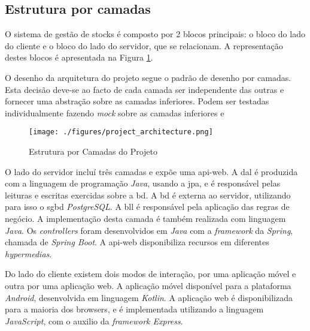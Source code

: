 %
%
\subsection{Estrutura por camadas}\label{subsec222}

O sistema de gestão de stocks é composto por 2 blocos principais: o bloco do lado do cliente e o bloco do lado do servidor, que se relacionam. A representação destes blocos é apresentada na Figura \ref{project-layers-structure}.

O desenho da arquitetura do projeto segue o padrão de desenho por camadas. Esta decisão deve-se ao facto de cada camada ser independente das outras e fornecer uma abstração sobre as camadas inferiores. Podem ser testadas individualmente fazendo \textit{mock} sobre as camadas inferiores e 

\begin{figure}[H]
	\centering
	\texttt{[image: ./figures/project\_architecture.png]}
	\caption{Estrutura por Camadas do Projeto}
	\label{project-layers-structure}
\end{figure}


O lado do servidor incluí três camadas e expõe uma \gls{api-web}. A \acrfull{dal} é produzida com a linguagem de programação \textit{Java}, usando a \acrfull{jpa}, e é responsável pelas leituras e escritas exercidas sobre a \acrfull{bd}. A \acrshort{bd} é externa ao servidor, utilizando para isso o \acrfull{sgbd} \textit{PostgreSQL}. A \acrfull{bll} é responsável pela aplicação das regras de negócio. A implementação desta camada é também realizada com linguagem \textit{Java}. Os \textit{controllers} foram desenvolvidos em \textit{Java} com a \textit{framework} da \textit{Spring}, chamada de \textit{Spring Boot}. A \gls{api-web} disponibiliza recursos em diferentes \textit{hypermedias}.

Do lado do cliente existem dois modos de interação, por uma aplicação móvel e outra por uma aplicação web. A aplicação móvel disponível para a plataforma \textit{Android}, desenvolvida em linguagem \textit{Kotlin}. A aplicação web é disponibilizada para a maioria dos browsers, e é implementada utilizando a linguagem \textit{JavaScript}, com o auxilio da \textit{framework Express}.